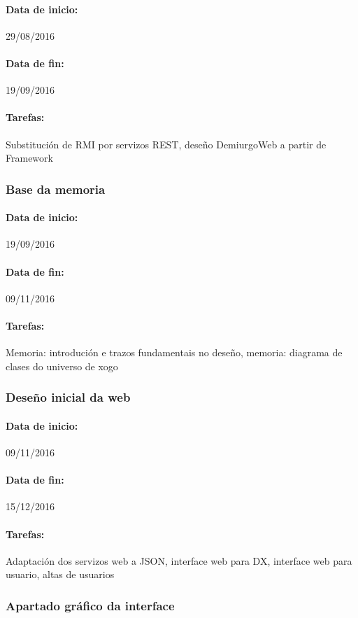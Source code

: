 \paragraph{Data de inicio:} 29/08/2016
\paragraph{Data de fin:} 19/09/2016
\paragraph{Tarefas:} Substitución de RMI por servizos REST, deseño DemiurgoWeb a
partir de Framework

\subsubsection{Base da memoria}
\paragraph{Data de inicio:} 19/09/2016
\paragraph{Data de fin:} 09/11/2016
\paragraph{Tarefas:} Memoria: introdución e trazos fundamentais no deseño,
memoria: diagrama de clases do universo de xogo

\subsubsection{Deseño inicial da web}
\paragraph{Data de inicio:} 09/11/2016
\paragraph{Data de fin:} 15/12/2016
\paragraph{Tarefas:} Adaptación dos servizos web a JSON, interface web 	para DX,
interface web para usuario, altas de usuarios

\subsubsection{Apartado gráfico da interface}
